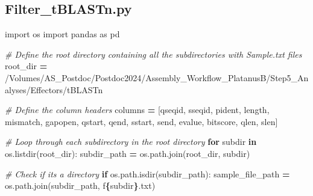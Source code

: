\documentclass[
]{book}
\newenvironment{Shaded}{\begin{snugshade}}{\end{snugshade}}
\newcommand{\CommentTok}[1]{\textcolor[rgb]{0.56,0.35,0.01}{\textit{#1}}}
\newcommand{\ControlFlowTok}[1]{\textcolor[rgb]{0.13,0.29,0.53}{\textbf{#1}}}
\newcommand{\ImportTok}[1]{#1}
\newcommand{\KeywordTok}[1]{\textcolor[rgb]{0.13,0.29,0.53}{\textbf{#1}}}
\newcommand{\NormalTok}[1]{#1}
\newcommand{\OperatorTok}[1]{\textcolor[rgb]{0.81,0.36,0.00}{\textbf{#1}}}
\newcommand{\SpecialCharTok}[1]{\textcolor[rgb]{0.81,0.36,0.00}{\textbf{#1}}}
\newcommand{\SpecialStringTok}[1]{\textcolor[rgb]{0.31,0.60,0.02}{#1}}
\newcommand{\StringTok}[1]{\textcolor[rgb]{0.31,0.60,0.02}{#1}}
\begin{document}
\subsection{Filter\_tBLASTn.py}\label{filtertblastn-script}

\begin{Shaded}
\begin{Highlighting}[]
\ImportTok{import}\NormalTok{ os}
\ImportTok{import}\NormalTok{ pandas }\ImportTok{as}\NormalTok{ pd}

\CommentTok{\# Define the root directory containing all the subdirectories with Sample.txt files}
\NormalTok{root\_dir }\OperatorTok{=} \StringTok{\textquotesingle{}/Volumes/AS\_Postdoc/Postdoc2024/Assembly\_Workflow\_PlatanusB/Step5\_Analyses/Effectors/tBLASTn\textquotesingle{}}

\CommentTok{\# Define the column headers}
\NormalTok{columns }\OperatorTok{=}\NormalTok{ [}\StringTok{\textquotesingle{}qseqid\textquotesingle{}}\NormalTok{, }\StringTok{\textquotesingle{}sseqid\textquotesingle{}}\NormalTok{, }\StringTok{\textquotesingle{}pident\textquotesingle{}}\NormalTok{, }\StringTok{\textquotesingle{}length\textquotesingle{}}\NormalTok{, }\StringTok{\textquotesingle{}mismatch\textquotesingle{}}\NormalTok{, }\StringTok{\textquotesingle{}gapopen\textquotesingle{}}\NormalTok{, }
           \StringTok{\textquotesingle{}qstart\textquotesingle{}}\NormalTok{, }\StringTok{\textquotesingle{}qend\textquotesingle{}}\NormalTok{, }\StringTok{\textquotesingle{}sstart\textquotesingle{}}\NormalTok{, }\StringTok{\textquotesingle{}send\textquotesingle{}}\NormalTok{, }\StringTok{\textquotesingle{}evalue\textquotesingle{}}\NormalTok{, }\StringTok{\textquotesingle{}bitscore\textquotesingle{}}\NormalTok{, }\StringTok{\textquotesingle{}qlen\textquotesingle{}}\NormalTok{, }\StringTok{\textquotesingle{}slen\textquotesingle{}}\NormalTok{]}

\CommentTok{\# Loop through each subdirectory in the root directory}
\ControlFlowTok{for}\NormalTok{ subdir }\KeywordTok{in}\NormalTok{ os.listdir(root\_dir):}
\NormalTok{    subdir\_path }\OperatorTok{=}\NormalTok{ os.path.join(root\_dir, subdir)}
    
    \CommentTok{\# Check if it\textquotesingle{}s a directory}
    \ControlFlowTok{if}\NormalTok{ os.path.isdir(subdir\_path):}
\NormalTok{        sample\_file\_path }\OperatorTok{=}\NormalTok{ os.path.join(subdir\_path, }\SpecialStringTok{f\textquotesingle{}}\SpecialCharTok{\{}\NormalTok{subdir}\SpecialCharTok{\}}\SpecialStringTok{.txt\textquotesingle{}}\NormalTok{)}
        

\end{Highlighting}
\end{Shaded}
\end{document}
